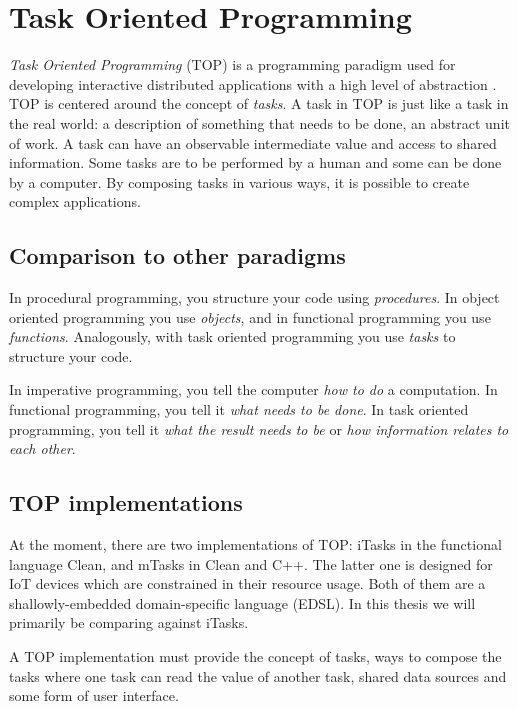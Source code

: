 \section{Task Oriented Programming}\label{section-top}

\textit{Task Oriented Programming} (TOP) is a programming paradigm used for developing interactive distributed applications with a high level of abstraction \cite{plasmeijer2012task}. TOP is centered around the concept of \textit{tasks}. A task in TOP is just like a task in the real world: a description of something that needs to be done, an abstract unit of work. A task can have an observable intermediate value and access to shared information. Some tasks are to be performed by a human and some can be done by a computer. By composing tasks in various ways, it is possible to create complex applications.

\subsection{Comparison to other paradigms}
In procedural programming, you structure your code using \textit{procedures}. In object oriented programming you use \textit{objects}, and in functional programming you use \textit{functions}. Analogously, with task oriented programming you use \textit{tasks} to structure your code.

In imperative programming, you tell the computer \textit{how to do} a computation. In functional programming, you tell it \textit{what needs to be done}. In task oriented programming, you tell it \textit{what the result needs to be} or \textit{how information relates to each other}.

\subsection{TOP implementations}
At the moment, there are two implementations of TOP: iTasks in the functional language Clean, and mTasks in Clean and C++. The latter one is designed for IoT devices which are constrained in their resource usage. Both of them are a shallowly-embedded domain-specific language (EDSL). In this thesis we will primarily be comparing against iTasks.

A TOP implementation must provide the concept of tasks, ways to compose the tasks where one task can read the value of another task, shared data sources and some form of user interface.

